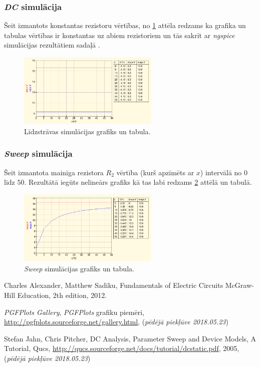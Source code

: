 \documentclass[12pt,table]{report}
\begin{document}
\subsubsection{\emph{DC} simulācija}
Šeit izmantots konstantas rezistoru vērtības, no \ref{fig:qucs_dc} attēla redzams ka grafika
un tabulas vērtības ir konstantas uz abiem rezistoriem un tās sakrīt ar \emph{ngspice} simulācijas
rezultātiem sadaļā .
\begin{figure}[H]
    \centering
		\includegraphics[width=0.6\textwidth]{img/qucs_simulation_dc.png}
    \caption{Līdzstrāvas simulācijas grafiks un tabula.}
    \label{fig:qucs_dc}
\end{figure}

\subsubsection{\emph{Sweep} simulācija}
Šeit izmantota mainīga rezistora $R_2$ vērtība (kurš apzīmēts ar $x$) intervālā no $0$ līdz $50$.
Rezultātā iegūts nelineārs grafiks kā tas labi redzams \ref{fig:qucs_sweep} attēlā un tabulā.
\begin{figure}[H]
    \centering
		\includegraphics[width=0.6\textwidth]{img/qucs_simulation_sweep.png}
    \caption{\emph{Sweep} simulācijas grafiks un tabula.}
    \label{fig:qucs_sweep}
\end{figure}

\begin{thebibliography}{9}

  Charles Alexander, Matthew Sadiku,
  Fundamentals of Electric Circuits
  McGraw-Hill Education,
  2th edition,
  2012.

  \emph{PGFPlots Gallery},
  \emph{PGFPlots} grafiku piemēri,
  \url{http://pgfplots.sourceforge.net/gallery.html},
  (\emph{pēdējā piekļūve 2018.05.23})

  Stefan Jahn, Chris Pitcher,
  DC Analysis, Parameter Sweep and Device Models, A Tutorial, Qucs,
  \url{http://qucs.sourceforge.net/docs/tutorial/dcstatic.pdf},
  2005,
  (\emph{pēdējā piekļūve 2018.05.23})

\end{thebibliography}
\end{document}
